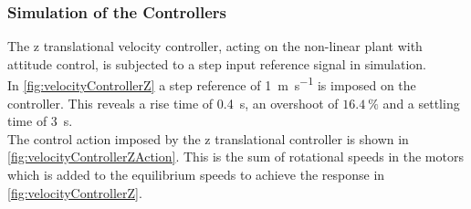 \subsubsection{Simulation of the Controllers}
The z translational velocity controller, acting on the non-linear plant with attitude control, is subjected to a step input reference signal in simulation.\\
In \autoref{fig:velocityControllerZ} a step reference of \SI{1}{m s^{-1}} is imposed on the controller. This reveals a rise time of \SI{0.4}{s}, an overshoot of $16.4\ \%$ and a settling time of \SI{3}{s}.\\
The control action imposed by the z translational controller is shown in \autoref{fig:velocityControllerZAction}. This is the sum of rotational speeds in the motors which is added to the equilibrium speeds to achieve the response in \autoref{fig:velocityControllerZ}.

